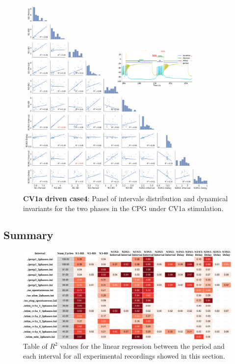 \begin{figure}[htbp]
	\centering
	\includegraphics[width=0.9\textwidth]{./invariants/data/SUSSEX/CV1a_driven4/images/2phases/panel_with_pairplot.pdf}
	\caption{\textbf{CV1a driven case4}: Panel of intervals distribution and dynamical invariants for the two phases in the CPG under CV1a stimulation.}
	\label{fig:cv1a 4 2phases pairplot}
\end{figure}

\subsection{Summary}
\begin{figure}
	\includegraphics[width=\textwidth]{./invariants/styled_table_invariants_r-squared.pdf}
	\caption{Table of $R^2$ values for the linear regression between the period and each interval for all experimental recordings showed in this section.}
	\label{fig:R2 table}
\end{figure}

